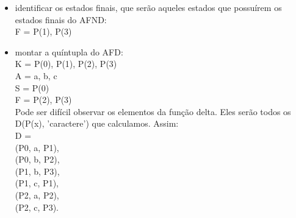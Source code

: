 \documentclass[a4paper,10pt]{article} %
\begin{document}
{\begin{itemize}
        \item identificar os estados finais, que serão aqueles estados que possuírem os estados finais do AFND:
            \\F = {P(1), P(3)}
        \item montar a quíntupla do AFD:
            \\K = {P(0), P(1), P(2), P(3)}\\A = {a, b, c}\\S = {P(0)}\\F = {P(2), P(3)}\\Pode ser difícil observar os elementos da função delta. Eles serão todos os D(P(x), 'caractere') que calculamos. Assim:\\D =\\(P0, a, P1),\\(P0, b, P2),\\(P1, b, P3),\\(P1, c, P1),\\(P2, a, P2),\\(P2, c, P3).
    \end{itemize}
    \begin{center}
    \end{center}

}
\end{document}
